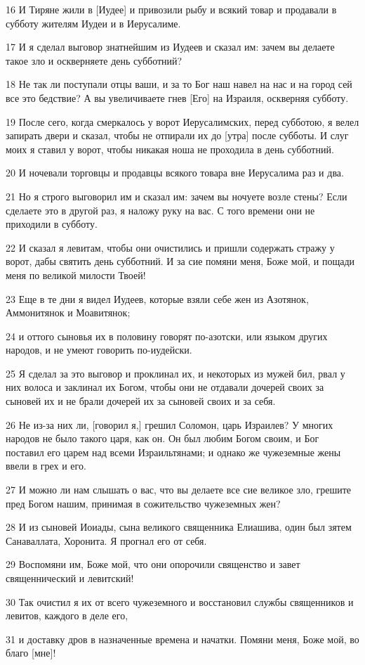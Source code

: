 \par 16 И Тиряне жили в [Иудее] и привозили рыбу и всякий товар и продавали в субботу жителям Иудеи и в Иерусалиме.
\par 17 И я сделал выговор знатнейшим из Иудеев и сказал им: зачем вы делаете такое зло и оскверняете день субботний?
\par 18 Не так ли поступали отцы ваши, и за то Бог наш навел на нас и на город сей все это бедствие? А вы увеличиваете гнев [Его] на Израиля, оскверняя субботу.
\par 19 После сего, когда смеркалось у ворот Иерусалимских, перед субботою, я велел запирать двери и сказал, чтобы не отпирали их до [утра] после субботы. И слуг моих я ставил у ворот, чтобы никакая ноша не проходила в день субботний.
\par 20 И ночевали торговцы и продавцы всякого товара вне Иерусалима раз и два.
\par 21 Но я строго выговорил им и сказал им: зачем вы ночуете возле стены? Если сделаете это в другой раз, я наложу руку на вас. С того времени они не приходили в субботу.
\par 22 И сказал я левитам, чтобы они очистились и пришли содержать стражу у ворот, дабы святить день субботний. И за сие помяни меня, Боже мой, и пощади меня по великой милости Твоей!
\par 23 Еще в те дни я видел Иудеев, которые взяли себе жен из Азотянок, Аммонитянок и Моавитянок;
\par 24 и оттого сыновья их в половину говорят по-азотски, или языком других народов, и не умеют говорить по-иудейски.
\par 25 Я сделал за это выговор и проклинал их, и некоторых из мужей бил, рвал у них волоса и заклинал их Богом, чтобы они не отдавали дочерей своих за сыновей их и не брали дочерей их за сыновей своих и за себя.
\par 26 Не из-за них ли, [говорил я,] грешил Соломон, царь Израилев? У многих народов не было такого царя, как он. Он был любим Богом своим, и Бог поставил его царем над всеми Израильтянами; и однако же чужеземные жены ввели в грех и его.
\par 27 И можно ли нам слышать о вас, что вы делаете все сие великое зло, грешите пред Богом нашим, принимая в сожительство чужеземных жен?
\par 28 И из сыновей Иоиады, сына великого священника Елиашива, один был зятем Санаваллата, Хоронита. Я прогнал его от себя.
\par 29 Воспомяни им, Боже мой, что они опорочили священство и завет священнический и левитский!
\par 30 Так очистил я их от всего чужеземного и восстановил службы священников и левитов, каждого в деле его,
\par 31 и доставку дров в назначенные времена и начатки. Помяни меня, Боже мой, во благо [мне]!


